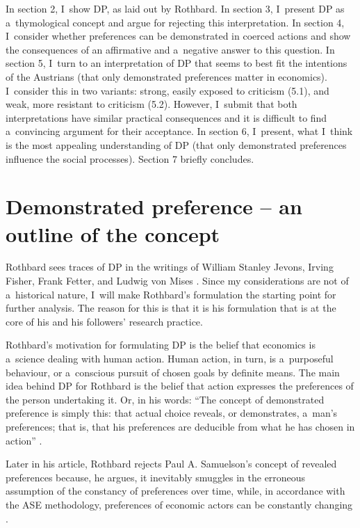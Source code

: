 In section 2, I~show DP, as laid out by Rothbard. In section 3, I~present DP as a~thymological concept and argue for rejecting this interpretation. In section 4, I~consider whether preferences can be demonstrated in coerced actions and show the consequences of an affirmative and a~negative answer to this question. In section 5, I~turn to an interpretation of DP that seems to best fit the intentions of the Austrians (that only demonstrated preferences matter in economics). I~consider this in two variants: strong, easily exposed to criticism (5.1), and weak, more resistant to criticism (5.2). However, I~submit that both interpretations have similar practical consequences and it is difficult to find a~convincing argument for their acceptance. In section 6, I~present, what I~think is the most appealing understanding of DP (that only demonstrated preferences influence the social processes). Section 7 briefly concludes.



\section{Demonstrated preference -- an outline of the concept}

Rothbard sees traces of DP in the writings of William Stanley Jevons, Irving Fisher, Frank Fetter, and Ludwig von Mises 
\parencite[][p.290]{rothbard_present_2011}. %
 Since my considerations are not of a~historical nature, I~will make Rothbard's formulation the starting point for further analysis. The reason for this is that it is his formulation that is at the core of his and his followers' research practice.



Rothbard's motivation for formulating DP is the belief that economics is a~science dealing with human action. Human action, in turn, is a~purposeful behaviour, or a~conscious pursuit of chosen goals by definite means. The main idea behind DP for Rothbard is the belief that action expresses the preferences of the person undertaking it. Or, in his words: ``The concept of demonstrated preference is simply this: that actual choice reveals, or demonstrates, a~man's preferences; that is, that his preferences are deducible from what he has chosen in action'' 
\parencite[][p.290]{rothbard_present_2011}.%




Later in his article, Rothbard rejects Paul A. Samuelson's concept of revealed preferences because, he argues, it inevitably smuggles in the erroneous assumption of the constancy of preferences over time, while, in accordance with the ASE methodology, preferences of economic actors can be constantly changing 
\parencite[][p.294]{rothbard_present_2011}.%




